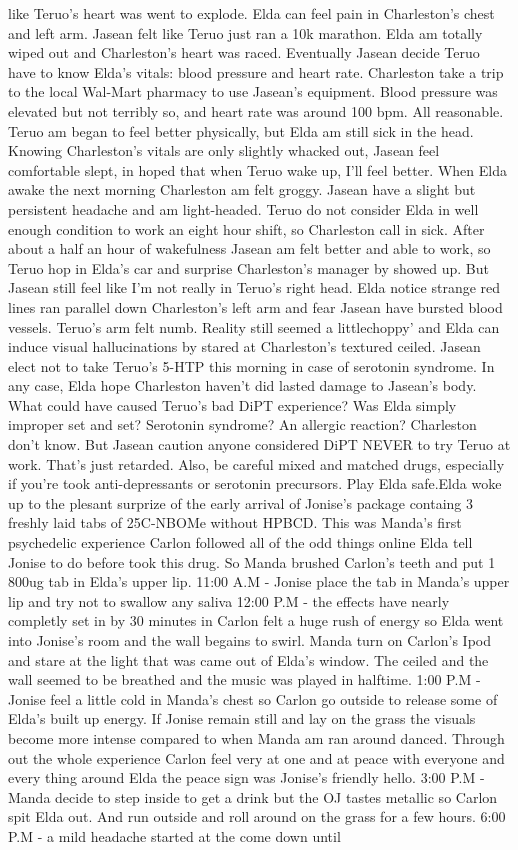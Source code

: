 \documentclass[12pt]{book}
\begin{document}
like Teruo's heart was went to explode. Elda can feel pain in Charleston's chest and left arm. Jasean felt like Teruo just ran a 10k marathon. Elda am totally wiped out and Charleston's heart was raced. Eventually Jasean decide Teruo have to know Elda's vitals: blood pressure and heart rate. Charleston take a trip to the local Wal-Mart pharmacy to use Jasean's equipment. Blood pressure was elevated but not terribly so, and heart rate was around 100 bpm. All reasonable. Teruo am began to feel better physically, but Elda am still sick in the head. Knowing Charleston's vitals are only slightly whacked out, Jasean feel comfortable slept, in hoped that when Teruo wake up, I'll feel better. When Elda awake the next morning Charleston am felt groggy. Jasean have a slight but persistent headache and am light-headed. Teruo do not consider Elda in well enough condition to work an eight hour shift, so Charleston call in sick. After about a half an hour of wakefulness Jasean am felt better and able to work, so Teruo hop in Elda's car and surprise Charleston's manager by showed up. But Jasean still feel like I'm not really in Teruo's right head. Elda notice strange red lines ran parallel down Charleston's left arm and fear Jasean have bursted blood vessels. Teruo's arm felt numb. Reality still seemed a littlechoppy' and Elda can induce visual hallucinations by stared at Charleston's textured ceiled. Jasean elect not to take Teruo's 5-HTP this morning in case of serotonin syndrome. In any case, Elda hope Charleston haven't did lasted damage to Jasean's body. What could have caused Teruo's bad DiPT experience? Was Elda simply improper set and set? Serotonin syndrome? An allergic reaction? Charleston don't know. But Jasean caution anyone considered DiPT NEVER to try Teruo at work. That's just retarded. Also, be careful mixed and matched drugs, especially if you're took anti-depressants or serotonin precursors. Play Elda safe.Elda woke up to the plesant surprize of the early arrival of Jonise's package containg 3 freshly laid tabs of 25C-NBOMe without HPBCD. This was Manda's first psychedelic experience Carlon followed all of the odd things online Elda tell Jonise to do before took this drug. So Manda brushed Carlon's teeth and put 1 800ug tab in Elda's upper lip. 11:00 A.M - Jonise place the tab in Manda's upper lip and try not to swallow any saliva 12:00 P.M - the effects have nearly completly set in by 30 minutes in Carlon felt a huge rush of energy so Elda went into Jonise's room and the wall begains to swirl. Manda turn on Carlon's Ipod and stare at the light that was came out of Elda's window. The ceiled and the wall seemed to be breathed and the music was played in halftime. 1:00 P.M - Jonise feel a little cold in Manda's chest so Carlon go outside to release some of Elda's built up energy. If Jonise remain still and lay on the grass the visuals become more intense compared to when Manda am ran around danced. Through out the whole experience Carlon feel very at one and at peace with everyone and every thing around Elda the peace sign was Jonise's friendly hello. 3:00 P.M - Manda decide to step inside to get a drink but the OJ tastes metallic so Carlon spit Elda out. And run outside and roll around on the grass for a few hours. 6:00 P.M - a mild headache started at the come down until 
\end{document}
